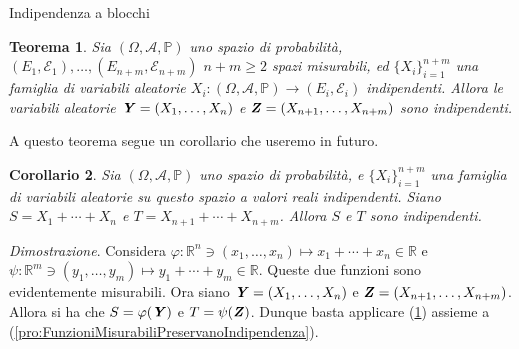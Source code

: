 \documentclass[11pt]{book}
\makeatletter
\theoremstyle{Definizione}
\theoremstyle{TeoremaProposizioneLemmaCorollario}
\newtheorem{myteo}{Teorema}[section]
\newtheorem{mycor}[myteo]{Corollario}
\theoremstyle{OsservazioneNota}
\renewenvironment{proof}[1][\proofname]{\par
  \normalfont \topsep6\p@\@plus6\p@\relax
  \trivlist
  \item[\hskip\labelsep
        \itshape
    #1\@addpunct{.}]\ignorespaces
}{%
  \endtrivlist\@endpefalse
}
\newcommand{\R}{\mathbb{R}}
\newcommand{\gri}[1]{\textbf{\textit{{#1}}}}
\renewcommand{\P}{\mathbb{P}}
\renewenvironment{proof}{\textsl{Dimostrazione}.}{}
\makeatother
\begin{document}
\begin{boxteo}{Indipendenza a blocchi}
\begin{myteo}\label{teo:IndipendenzaABlocchi}
Sia $(\Omega,\mathcal{A},\P)$ uno spazio di probabilità, $(E_1,\mathcal{E}_1),\dots,(E_{n+m},\mathcal{E}_{n+m})$ $n+m\geq 2$ spazi misurabili, ed $\{X_i\}_{i = 1}^{n+m}$ una famiglia di variabili aleatorie $X_i:(\Omega,\mathcal{A},\P)\longrightarrow (E_i,\mathcal{E}_{i})$ indipendenti. Allora le variabili aleatorie $\gri{Y} = (X_1,\dots,X_n)$ e $\gri{Z} = (X_{n+1},\dots,X_{n+m})$ sono indipendenti.
\end{myteo}
\end{boxteo}
\noindent
A questo teorema segue un corollario che useremo in futuro.
\begin{boxoss}
\begin{mycor}
Sia $(\Omega,\mathcal{A},\P)$ uno spazio di probabilità, e $\{X_i\}_{i = 1}^{n+m}$ una famiglia di variabili aleatorie su questo spazio a valori reali indipendenti. Siano $S = X_1+\cdots +X_n$ e $T = X_{n+1}+\cdots + X_{n+m}$. Allora $S$ e $T$ sono indipendenti.
\end{mycor}
\tcblower
\begin{proof}
Considera $\varphi:\R^n \ni (x_1,\dots,x_n) \mapsto x_1+\cdots +x_n\in \R$ e $\psi:\R^m \ni (y_1,\dots,y_m)\mapsto y_1+\cdots+y_m\in \R$. Queste due funzioni sono evidentemente misurabili. Ora siano $\gri{Y} = (X_1,\dots,X_n)$ e $\gri{Z} = (X_{n+1},\dots,X_{n+m})$. Allora si ha che $S = \varphi(\gri{Y})$ e $T = \psi(\gri{Z})$. Dunque basta applicare (\ref{teo:IndipendenzaABlocchi}) assieme a (\ref{pro:FunzioniMisurabiliPreservanoIndipendenza}).
\end{proof}
\end{boxoss}
\end{document}
